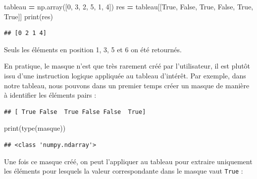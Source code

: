 \documentclass[12pt,]{book}
\newenvironment{Shaded}{\begin{snugshade}}{\end{snugshade}}
\newcommand{\DecValTok}[1]{\textcolor[rgb]{0.00,0.00,0.81}{#1}}
\newcommand{\VariableTok}[1]{\textcolor[rgb]{0.00,0.00,0.00}{#1}}
\newcommand{\OperatorTok}[1]{\textcolor[rgb]{0.81,0.36,0.00}{\textbf{#1}}}
\newcommand{\BuiltInTok}[1]{#1}
\newcommand{\NormalTok}[1]{#1}
\numberwithin{equation}{section}
\numberwithin{countremarque}{section}
\begin{document}
\begin{Shaded}
\begin{Highlighting}[]
\NormalTok{tableau }\OperatorTok{=}\NormalTok{ np.array([}\DecValTok{0}\NormalTok{, }\DecValTok{3}\NormalTok{, }\DecValTok{2}\NormalTok{, }\DecValTok{5}\NormalTok{, }\DecValTok{1}\NormalTok{, }\DecValTok{4}\NormalTok{])}
\NormalTok{res }\OperatorTok{=}\NormalTok{ tableau[[}\VariableTok{True}\NormalTok{, }\VariableTok{False}\NormalTok{, }\VariableTok{True}\NormalTok{, }\VariableTok{False}\NormalTok{, }\VariableTok{True}\NormalTok{, }\VariableTok{True}\NormalTok{]]}
\BuiltInTok{print}\NormalTok{(res)}
\end{Highlighting}
\end{Shaded}

\begin{lstlisting}
## [0 2 1 4]
\end{lstlisting}

Seuls les éléments en position 1, 3, 5 et 6 on été retournés.

En pratique, le masque n'est que très rarement créé par l'utilisateur,
il est plutôt issu d'une instruction logique appliquée au tableau
d'intérêt. Par exemple, dans notre tableau, nous pouvons dans un premier
temps créer un masque de manière à identifier les éléments pairs :

\begin{Shaded}
\end{Shaded}

\begin{lstlisting}
## [ True False  True False False  True]
\end{lstlisting}

\begin{Shaded}
\begin{Highlighting}[]
\BuiltInTok{print}\NormalTok{(}\BuiltInTok{type}\NormalTok{(masque))}
\end{Highlighting}
\end{Shaded}

\begin{lstlisting}
## <class 'numpy.ndarray'>
\end{lstlisting}

Une fois ce masque créé, on peut l'appliquer au tableau pour extraire
uniquement les éléments pour lesquels la valeur correspondante dans le
masque vaut \texttt{True} :
\end{document}
